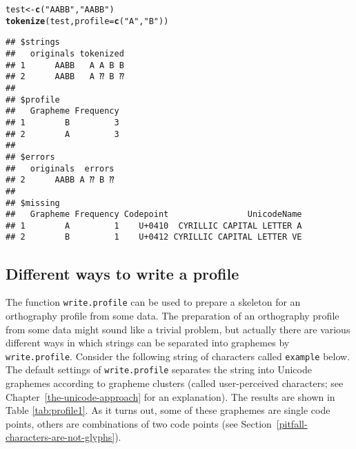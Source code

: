 \documentclass[output=book,nonflat,modfonts,
citecolor=brown,
		]{langsci/langscibook}\usepackage[]{graphicx}\usepackage[]{color}
\makeatletter
\newcommand{\hlstr}[1]{\textcolor[rgb]{0.192,0.494,0.8}{#1}}%
\newcommand{\hlstd}[1]{\textcolor[rgb]{0.345,0.345,0.345}{#1}}%
\newcommand{\hlkwb}[1]{\textcolor[rgb]{0.69,0.353,0.396}{#1}}%
\newcommand{\hlkwc}[1]{\textcolor[rgb]{0.333,0.667,0.333}{#1}}%
\newcommand{\hlkwd}[1]{\textcolor[rgb]{0.737,0.353,0.396}{\textbf{#1}}}%
\newenvironment{kframe}{%
 \def\at@end@of@kframe{}%
 \ifinner\ifhmode%
  \def\at@end@of@kframe{\end{minipage}}%
  \begin{minipage}{\columnwidth}%
 \fi\fi%
 \def\FrameCommand##1{\hskip\@totalleftmargin \hskip-\fboxsep
 \colorbox{shadecolor}{##1}\hskip-\fboxsep
     \hskip-\linewidth \hskip-\@totalleftmargin \hskip\columnwidth}%
 \MakeFramed {\advance\hsize-\width
   \@totalleftmargin\z@ \linewidth\hsize
   \@setminipage}}%
 {\par\unskip\endMakeFramed%
 \at@end@of@kframe}
\newenvironment{knitrout}{}{} %
\makeatother
\begin{document}
\begin{knitrout}\footnotesize
{}\color{fgcolor}\begin{kframe}
\begin{alltt}
\hlstd{test} \hlkwb{<-} \hlkwd{c}\hlstd{(}\hlstr{"AABB"}\hlstd{,} \hlstr{"AАBВ"}\hlstd{)}
\hlkwd{tokenize}\hlstd{(test,} \hlkwc{profile} \hlstd{=} \hlkwd{c}\hlstd{(}\hlstr{"A"}\hlstd{,} \hlstr{"B"}\hlstd{))}
\end{alltt}


{\ttfamily\noindent{}}\begin{verbatim}
## $strings
##   originals tokenized
## 1      AABB   A A B B
## 2      AАBВ   A ⁇ B ⁇
## 
## $profile
##   Grapheme Frequency
## 1        B         3
## 2        A         3
## 
## $errors
##   originals  errors
## 2      AАBВ A ⁇ B ⁇
## 
## $missing
##   Grapheme Frequency Codepoint                UnicodeName
## 1        А         1    U+0410  CYRILLIC CAPITAL LETTER A
## 2        В         1    U+0412 CYRILLIC CAPITAL LETTER VE
\end{verbatim}
\end{kframe}
\end{knitrout}

\subsection*{Different ways to write a profile}
\label{write-profile}

The function \texttt{write.profile} can be used to prepare a skeleton for an
orthography profile from some data. The preparation of an orthography profile
from some data might sound like a trivial problem, but actually there are
various different ways in which strings can be separated into graphemes by
\texttt{write.profile}. Consider the following string of characters called
\texttt{example} below. The default settings of \texttt{write.profile} separates
the string into Unicode graphemes according to grapheme clusters (called user-perceived characters; see Chapter~\ref{the-unicode-approach} for an explanation). The results are shown 
in Table \ref {tab:profile1}. As it 
turns out, some of these graphemes are single code points, others are combinations
of two code points (see Section~\ref{pitfall-characters-are-not-glyphs}).
\end{document}
